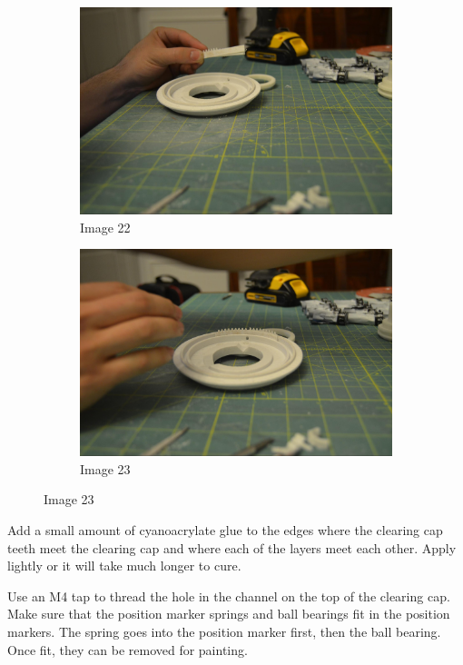 \documentclass[openany]{book}
\begin{document}
\begin{figure}[!ht]
	\centering
	\begin{subfigure}{.4\textwidth}
		\centering
		\includegraphics[width=.95\textwidth]{images/image22.jpg}
		\caption{Image 22}
		\label{fig:image22}	
	\end{subfigure}
	\begin{subfigure}{.4\textwidth}
		\centering
		\includegraphics[width=.95\textwidth]{images/image23.jpg}
		\caption{Image 23}
		\label{fig:image23}	
	\end{subfigure}
\end{figure}




Add a small amount of cyanoacrylate glue to the edges where the clearing cap teeth meet the clearing cap and where each of the layers meet each other. Apply lightly or it will take much longer to cure.

Use an M4 tap to thread the hole in the channel on the top of the clearing cap. Make sure that the position marker springs and ball bearings fit in the position markers. The spring goes into the position marker  first, then the ball bearing. Once fit, they can be removed for painting.
\end{document}
